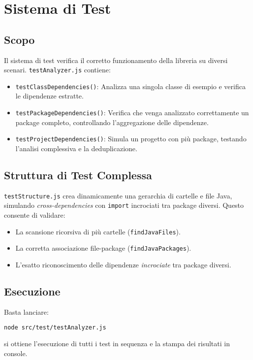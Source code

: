 \documentclass[a4paper,12pt]{article}
\begin{document}
\section{Sistema di Test}\label{sec:tests}
\subsection{Scopo}
Il sistema di test verifica il corretto funzionamento della libreria su diversi scenari. \texttt{testAnalyzer.js} contiene:
\begin{itemize}
  \item \texttt{testClassDependencies()}: Analizza una singola classe di esempio e verifica le dipendenze estratte.
  \item \texttt{testPackageDependencies()}: Verifica che venga analizzato correttamente un package completo, controllando l'aggregazione delle dipendenze.
  \item \texttt{testProjectDependencies()}: Simula un progetto con pi\`u package, testando l'analisi complessiva e la deduplicazione.
\end{itemize}

\subsection{Struttura di Test Complessa}
\texttt{testStructure.js} crea dinamicamente una gerarchia di cartelle e file Java, simulando \emph{cross-dependencies} con \texttt{import} incrociati tra package diversi. Questo consente di validare:
\begin{itemize}
    \item La scansione ricorsiva di pi\`u cartelle (\texttt{findJavaFiles}).
    \item La corretta associazione file-package (\texttt{findJavaPackages}).
    \item L'esatto riconoscimento delle dipendenze \emph{incrociate} tra package diversi.
\end{itemize}

\subsection{Esecuzione}
Basta lanciare:
\begin{verbatim}
node src/test/testAnalyzer.js
\end{verbatim}
si ottiene l'esecuzione di tutti i test in sequenza e la stampa dei risultati in console.
\end{document}
